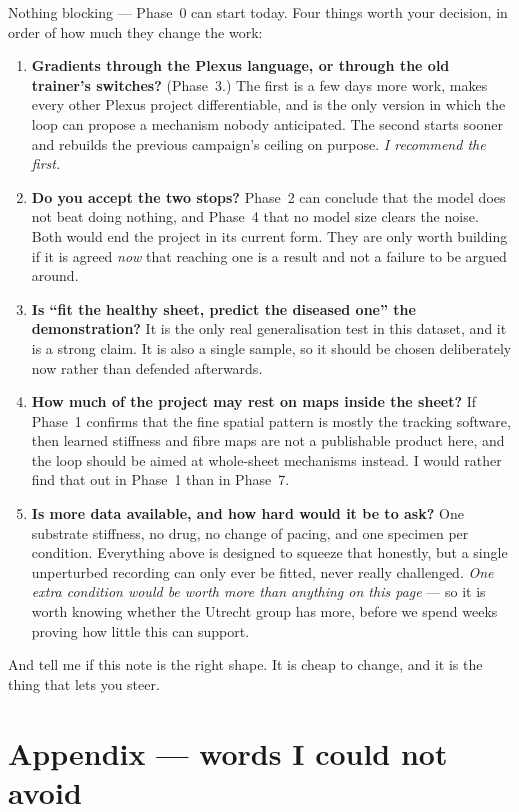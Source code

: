 \documentclass[11pt,a4paper]{article}
\begin{document}
Nothing blocking --- Phase~0 can start today. Four things worth your decision, in order of how much
they change the work:

\begin{enumerate}[leftmargin=1.4em]
\item \textbf{Gradients through the Plexus language, or through the old trainer's switches?}
(Phase~3.) The first is a few days more work, makes every other Plexus project differentiable, and is
the only version in which the loop can propose a mechanism nobody anticipated. The second starts
sooner and rebuilds the previous campaign's ceiling on purpose. \emph{I recommend the first.}
\item \textbf{Do you accept the two stops?} Phase~2 can conclude that the model does not beat doing
nothing, and Phase~4 that no model size clears the noise. Both would end the project in its current
form. They are only worth building if it is agreed \emph{now} that reaching one is a result and not a
failure to be argued around.
\item \textbf{Is ``fit the healthy sheet, predict the diseased one'' the demonstration?} It is the only
real generalisation test in this dataset, and it is a strong claim. It is also a single sample, so it
should be chosen deliberately now rather than defended afterwards.
\item \textbf{How much of the project may rest on maps inside the sheet?} If Phase~1 confirms that
the fine spatial pattern is mostly the tracking software, then learned stiffness and fibre maps are
not a publishable product here, and the loop should be aimed at whole-sheet mechanisms instead. I
would rather find that out in Phase~1 than in Phase~7.
\item \textbf{Is more data available, and how hard would it be to ask?} One substrate stiffness, no
drug, no change of pacing, and one specimen per condition. Everything above is designed to squeeze
that honestly, but a single unperturbed recording can only ever be fitted, never really challenged.
\emph{One extra condition would be worth more than anything on this page} --- so it is worth knowing
whether the Utrecht group has more, before we spend weeks proving how little this can support.
\end{enumerate}

And tell me if this note is the right shape. It is cheap to change, and it is the thing that lets you
steer.

\section*{Appendix --- words I could not avoid}
\end{document}
